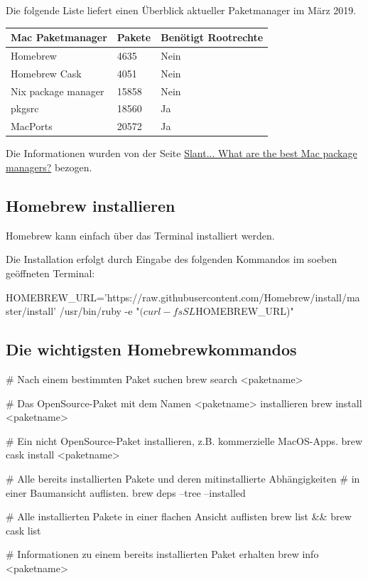 \documentclass[]{article}
\begin{document}
Die folgende Liste liefert einen Überblick aktueller Paketmanager im März 2019.

\begin{tabular}[t]{lll}
	\toprule
	Mac Paketmanager & Pakete & Benötigt Rootrechte \\
	\midrule
	Homebrew & 4635 & Nein \\
	Homebrew Cask & 4051 & Nein \\
	Nix package manager & 15858 & Nein \\
	pkgsrc & 18560 & Ja \\
	MacPorts & 20572 & Ja \\
	\bottomrule
\end{tabular}

Die Informationen wurden von der Seite \href{https://www.slant.co/topics/511/~best-mac-package-managers#3}{Slant...  What are the best Mac package managers?} bezogen.

\subsection{Homebrew installieren}
Homebrew kann einfach über das Terminal installiert werden.

Die Installation erfolgt durch Eingabe des folgenden Kommandos im soeben geöffneten Terminal:
\begin{bashcode}
HOMEBREW_URL='https://raw.githubusercontent.com/Homebrew/install/master/install'
/usr/bin/ruby -e "$(curl -fsSL $HOMEBREW_URL)"
\end{bashcode}

\subsection{Die wichtigsten Homebrewkommandos}
\begin{bashcode}
# Nach einem bestimmten Paket suchen
brew search <paketname> 

# Das OpenSource-Paket mit dem Namen <paketname> installieren
brew install <paketname>

# Ein nicht OpenSource-Paket installieren,  z.B. kommerzielle MacOS-Apps.
brew cask install <paketname>  

# Alle bereits installierten Pakete und deren mitinstallierte Abhängigkeiten 
# in einer Baumansicht auflisten.
brew deps --tree --installed

# Alle installierten Pakete in einer flachen Ansicht auflisten
brew list && brew cask list

# Informationen zu einem bereits installierten Paket erhalten
brew info <paketname> 
\end{bashcode}
\end{document}
